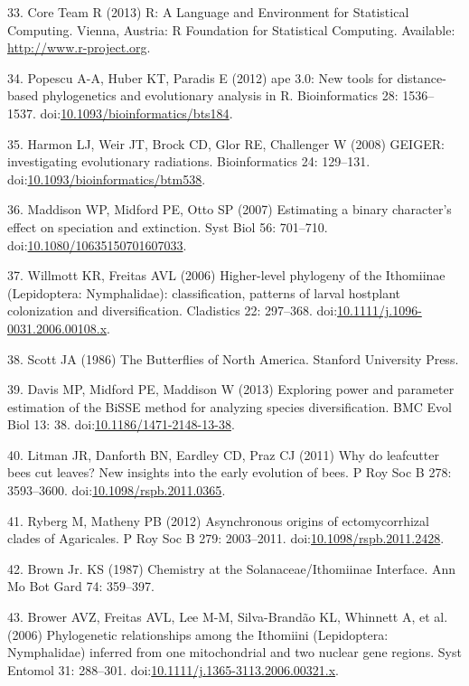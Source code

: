 \documentclass[]{article}
\begin{document}
33. Core Team R (2013) R: A Language and Environment for Statistical
Computing. Vienna, Austria: R Foundation for Statistical Computing.
Available: \url{http://www.r-project.org}.

34. Popescu A-A, Huber KT, Paradis E (2012) ape 3.0: New tools for
distance-based phylogenetics and evolutionary analysis in R.
Bioinformatics 28: 1536--1537.
doi:\href{http://dx.doi.org/10.1093/bioinformatics/bts184}{10.1093/bioinformatics/bts184}.

35. Harmon LJ, Weir JT, Brock CD, Glor RE, Challenger W (2008) GEIGER:
investigating evolutionary radiations. Bioinformatics 24: 129--131.
doi:\href{http://dx.doi.org/10.1093/bioinformatics/btm538}{10.1093/bioinformatics/btm538}.

36. Maddison WP, Midford PE, Otto SP (2007) Estimating a binary
character's effect on speciation and extinction. Syst Biol 56: 701--710.
doi:\href{http://dx.doi.org/10.1080/10635150701607033}{10.1080/10635150701607033}.

37. Willmott KR, Freitas AVL (2006) Higher-level phylogeny of the
Ithomiinae (Lepidoptera: Nymphalidae): classification, patterns of
larval hostplant colonization and diversification. Cladistics 22:
297--368.
doi:\href{http://dx.doi.org/10.1111/j.1096-0031.2006.00108.x}{10.1111/j.1096-0031.2006.00108.x}.

38. Scott JA (1986) The Butterflies of North America. Stanford
University Press.

39. Davis MP, Midford PE, Maddison W (2013) Exploring power and
parameter estimation of the BiSSE method for analyzing species
diversification. BMC Evol Biol 13: 38.
doi:\href{http://dx.doi.org/10.1186/1471-2148-13-38}{10.1186/1471-2148-13-38}.

40. Litman JR, Danforth BN, Eardley CD, Praz CJ (2011) Why do leafcutter
bees cut leaves? New insights into the early evolution of bees. P Roy
Soc B 278: 3593--3600.
doi:\href{http://dx.doi.org/10.1098/rspb.2011.0365}{10.1098/rspb.2011.0365}.

41. Ryberg M, Matheny PB (2012) Asynchronous origins of ectomycorrhizal
clades of Agaricales. P Roy Soc B 279: 2003--2011.
doi:\href{http://dx.doi.org/10.1098/rspb.2011.2428}{10.1098/rspb.2011.2428}.

42. Brown Jr. KS (1987) Chemistry at the Solanaceae/Ithomiinae
Interface. Ann Mo Bot Gard 74: 359--397.

43. Brower AVZ, Freitas AVL, Lee M-M, Silva-Brandão KL, Whinnett A, et
al. (2006) Phylogenetic relationships among the Ithomiini (Lepidoptera:
Nymphalidae) inferred from one mitochondrial and two nuclear gene
regions. Syst Entomol 31: 288--301.
doi:\href{http://dx.doi.org/10.1111/j.1365-3113.2006.00321.x}{10.1111/j.1365-3113.2006.00321.x}.
\end{document}
